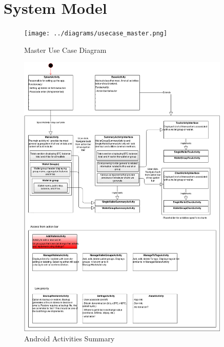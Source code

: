 \clearpage
\section{System Model}

\begin{figure}[H]
    \texttt{[image: ../diagrams/usecase\_master.png]}
	\caption{Master Use Case Diagram}
\end{figure}


\begin{figure}[H]
    \includegraphics[width=0.9\textwidth]{../diagrams/android_activities.png}
	\caption{Android Activities Summary}
\end{figure}